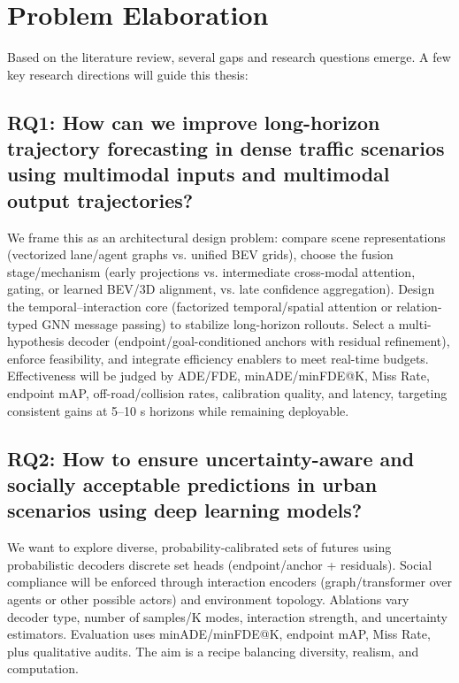 \documentclass[12pt,a4paper]{report}
\begin{document}
\section{Problem Elaboration}
\quad Based on the literature review, several gaps and research questions emerge. A few key research directions will guide this thesis:

\subsection*{RQ1: How can we improve long-horizon trajectory forecasting in dense traffic scenarios using multimodal inputs and multimodal output trajectories?}
We frame this as an architectural design problem: compare scene representations (vectorized lane/agent graphs vs. unified BEV grids), choose the fusion stage/mechanism (early projections vs. intermediate cross-modal attention, gating, or learned BEV/3D alignment, vs. late confidence aggregation). Design the temporal–interaction core (factorized temporal/spatial attention or relation-typed GNN message passing) to stabilize long-horizon rollouts. Select a multi-hypothesis decoder (endpoint/goal-conditioned anchors with residual refinement), enforce feasibility, and integrate efficiency enablers to meet real-time budgets. Effectiveness will be judged by ADE/FDE, minADE/minFDE@K, Miss Rate, endpoint mAP, off-road/collision rates, calibration quality, and latency, targeting consistent gains at 5–10 s horizons while remaining deployable.

\subsection*{RQ2: How to ensure uncertainty-aware and socially acceptable predictions in urban scenarios using deep learning models?}
We want to explore diverse, probability-calibrated sets of futures using probabilistic decoders discrete set heads (endpoint/anchor + residuals). Social compliance will be enforced through interaction encoders (graph/transformer over agents or other possible actors) and environment topology. Ablations vary decoder type, number of samples/K modes, interaction strength, and uncertainty estimators. Evaluation uses minADE/minFDE@K, endpoint mAP, Miss Rate, plus qualitative audits. The aim is a recipe balancing diversity, realism, and computation.
\end{document}
